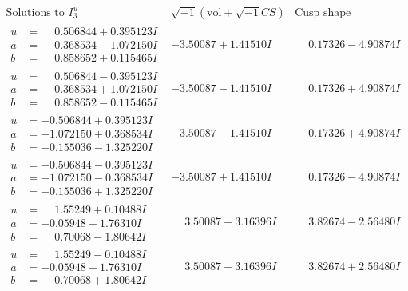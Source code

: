 \documentclass[1p]{elsarticle_modified}
\theoremstyle{definition}
\newcommand{\I}{\sqrt{-1}}
\begin{document}
$$\begin{array}{c|c|c}  
\text{Solutions to }I^u_{3}& \I (\text{vol} + \sqrt{-1}CS) & \text{Cusp shape}\\
 \hline 
\begin{aligned}
u &= \phantom{-}0.506844 + 0.395123 I \\
a &= \phantom{-}0.368534 - 1.072150 I \\
b &= \phantom{-}0.858652 + 0.115465 I\end{aligned}
 & -3.50087 + 1.41510 I & \phantom{-}0.17326 - 4.90874 I \\ \hline\begin{aligned}
u &= \phantom{-}0.506844 - 0.395123 I \\
a &= \phantom{-}0.368534 + 1.072150 I \\
b &= \phantom{-}0.858652 - 0.115465 I\end{aligned}
 & -3.50087 - 1.41510 I & \phantom{-}0.17326 + 4.90874 I \\ \hline\begin{aligned}
u &= -0.506844 + 0.395123 I \\
a &= -1.072150 + 0.368534 I \\
b &= -0.155036 - 1.325220 I\end{aligned}
 & -3.50087 - 1.41510 I & \phantom{-}0.17326 + 4.90874 I \\ \hline\begin{aligned}
u &= -0.506844 - 0.395123 I \\
a &= -1.072150 - 0.368534 I \\
b &= -0.155036 + 1.325220 I\end{aligned}
 & -3.50087 + 1.41510 I & \phantom{-}0.17326 - 4.90874 I \\ \hline\begin{aligned}
u &= \phantom{-}1.55249 + 0.10488 I \\
a &= -0.05948 + 1.76310 I \\
b &= \phantom{-}0.70068 - 1.80642 I\end{aligned}
 & \phantom{-}3.50087 + 3.16396 I & \phantom{-}3.82674 - 2.56480 I \\ \hline\begin{aligned}
u &= \phantom{-}1.55249 - 0.10488 I \\
a &= -0.05948 - 1.76310 I \\
b &= \phantom{-}0.70068 + 1.80642 I\end{aligned}
 & \phantom{-}3.50087 - 3.16396 I & \phantom{-}3.82674 + 2.56480 I \\ \hline\begin{aligned}

\end{aligned}
\end{array}$$
\end{document}
